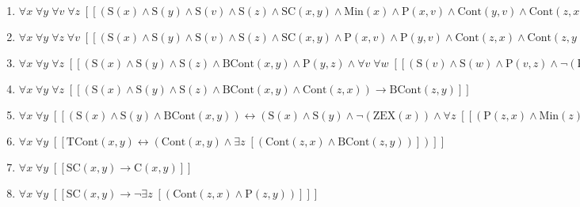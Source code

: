 \documentclass{article}
\begin{document}
\begin{enumerate}
\item $\forall x\; \forall y\; \forall v\; \forall z\;  \left[ \left[ \left(\textrm{S}(x) \land \textrm{S}(y) \land \textrm{S}(v) \land \textrm{S}(z) \land \textrm{SC}(x,y) \land \textrm{Min}(x) \land \textrm{P}(x,v) \land \textrm{Cont}(y,v) \land \textrm{Cont}(z,x) \land \textrm{Cont}(z,y)\right) \rightarrow \textrm{BCont}(z,x) \right] \right]$
\item $\forall x\; \forall y\; \forall z\; \forall v\;  \left[ \left[ \left(\textrm{S}(x) \land \textrm{S}(y) \land \textrm{S}(v) \land \textrm{S}(z) \land \textrm{SC}(x,y) \land \textrm{P}(x,v) \land \textrm{P}(y,v) \land \textrm{Cont}(z,x) \land \textrm{Cont}(z,y) \land \textrm{Covers}(v,z)\right) \rightarrow \neg \left(\textrm{BCont}(z,v)\right) \right] \right]$
\item $\forall x\; \forall y\; \forall z\;  \left[ \left[ \left(\textrm{S}(x) \land \textrm{S}(y) \land \textrm{S}(z) \land \textrm{BCont}(x,y) \land \textrm{P}(y,z) \land \forall v\; \forall w\;  \left[ \left[ \left(\textrm{S}(v) \land \textrm{S}(w) \land \textrm{P}(v,z) \land \neg \left(\textrm{PO}(v,y)\right) \land \textrm{P}(w,x)\right) \rightarrow \neg \left(\textrm{Cont}(w,v)\right) \right] \right]\right) \rightarrow \textrm{BCont}(x,z) \right] \right]$
\item $\forall x\; \forall y\; \forall z\;  \left[ \left[ \left(\textrm{S}(x) \land \textrm{S}(y) \land \textrm{S}(z) \land \textrm{BCont}(x,y) \land \textrm{Cont}(z,x)\right) \rightarrow \textrm{BCont}(z,y) \right] \right]$
\item $\forall x\; \forall y\;  \left[ \left[ \left(\textrm{S}(x) \land \textrm{S}(y) \land \textrm{BCont}(x,y)\right) \leftrightarrow \left(\textrm{S}(x) \land \textrm{S}(y) \land \neg \left(\textrm{ZEX}(x)\right) \land \forall z\;  \left[ \left[ \left(\textrm{P}(z,x) \land \textrm{Min}(z)\right) \rightarrow \textrm{BCont}(z,y) \right] \right]\right) \right] \right]$
\item $\forall x\; \forall y\;  \left[ \left[ \textrm{TCont}(x,y) \leftrightarrow \left(\textrm{Cont}(x,y) \land \exists z\;  \left[ \left(\textrm{Cont}(z,x) \land \textrm{BCont}(z,y)\right) \right]\right) \right] \right]$
\item $\forall x\; \forall y\;  \left[ \left[ \textrm{SC}(x,y) \rightarrow \textrm{C}(x,y) \right] \right]$
\item $\forall x\; \forall y\;  \left[ \left[ \textrm{SC}(x,y) \rightarrow \neg \exists z\;  \left[ \left(\textrm{Cont}(z,x) \land \textrm{P}(z,y)\right) \right] \right] \right]$

\end{enumerate}
\end{document}
